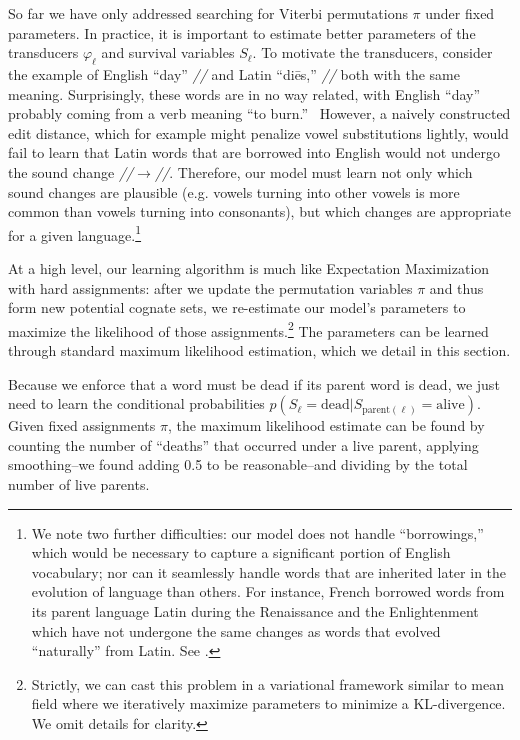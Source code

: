 \documentclass[11pt,a4paper]{article}
\begin{document}
So far we have only addressed searching for Viterbi permutations
$\pi$ under fixed parameters. In practice, it is important to
estimate better parameters of the transducers $\varphi_\ell$ and
survival variables $S_\ell$. To motivate the transducers, consider
the example of English ``day'' \textit{//} and Latin
``di\=es,'' \textit{//} both with the same meaning.
Surprisingly, these words are in no way related, with English ``day''
probably coming from a verb meaning ``to burn.''~\cite{oedDay}
However, a na\:ively constructed edit distance, which for example
might penalize vowel substitutions lightly, would fail to learn
that Latin words that are borrowed into English would not undergo
the sound change \textit{//}$ \to $\textit{//}.
Therefore, our model must learn not only which sound changes are
plausible (e.g. vowels turning into other vowels is more common
than vowels turning into consonants), but which changes are appropriate
for a given language.\footnote{We note two further difficulties:
our model does not handle ``borrowings,'' which would be necessary
to capture a significant portion of English vocabulary; nor can it
seamlessly handle words that are inherited later in the evolution
of language than others. For instance, French borrowed words from
its parent language Latin during the Renaissance and the Enlightenment
which have not undergone the same changes as words that evolved
``naturally'' from Latin. See \cite{bloomfield38language}.}

At a high level, our learning algorithm is much like Expectation
Maximization with hard assignments: after we update the permutation
variables $\pi$ and thus form new potential cognate sets, we
re-estimate our model's parameters to maximize the likelihood of
those assignments.\footnote{Strictly, we can cast this problem in
a variational framework similar to mean field where we iteratively
maximize parameters to minimize a KL-divergence. We omit details
for clarity.} The parameters can be learned through standard maximum
likelihood estimation, which we detail in this section.

Because we enforce that a word must be dead if its parent word is
dead, we just need to learn the conditional probabilities
$p(S_\ell=\mathrm{dead}| S_{\mathrm{parent}(\ell)}=\mathrm{alive})$.
Given fixed assignments $\pi$, the maximum likelihood estimate can
be found by counting the number of ``deaths'' that occurred under
a live parent, applying smoothing--we found adding 0.5 to be
reasonable--and dividing by the total number of live parents.
\end{document}
